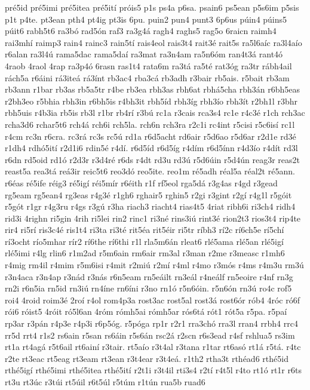 {pré5id
pré5imi
pré5itea
pré5ití
próis5
p1s
ps4a
p6sa.
psain6
ps5ean
p5s6im
p5sis
p1t
p4te.
pt3ean
pth4
pt4ig
pt3is
6pu.
puin2
pun4
punt3
6p6us
púin4
púins5
púit6
rabh5t6
ra3bó
rad5ón
raf3
ra3g4á
ragh4
raghs5
rag5o
6raicn
raimh4
rai3mhí
raimp3
rain4
rainc3
rain5tí
rais4eol
rais3t4
rait3é
rait5s
ra5l6aíc
ra3l4aío
r6alan
ra3l4ú
rama5dac
rama5daí
ra3mat
ra3n4am
ra5n6óm
ran4t3á
rant4ó
4raob
4raol
4rap
ra3p4ó
6rasn
ras1t4
rata6m
ra3tá
ra5té
rat3óg
ra3tr
rábh4ail
rách5a
r6áini
rá3iteá
rá3ínt
rb3ac4
rba3cá
rb3adh
r3bair
rb5ais.
r5bait
rb3am
rb3ann
r1bar
rb3as
rb5a5tr
r4be
rb3ea
rbh3as
rbh6at
rbhá5cha
rbh3án
r6bh5eas
r2bh3eo
r5bhia
rbh3in
r6bh5is
r4bh3it
rbh5íd
rbh3íg
rbh3ío
rbh3ít
r2bh1l
r3bhr
rbh5uis
r4b3ia
rb5is
rb3l
r1br
rb4rí
r3bú
rc1a
r3cais
rca3s4
rc1e
r4c3é
r1ch
rch3ac
rcha3d6
rchar5t6
rch4á
rch6i
rch5la.
rch6n
rch3ra
r2c1i
rc4int
r5cisi
r5c6isí
rc1l
r4cm
rc3n
r6cra.
rc3rá
rc3s
rc5ú
rd1a
r6d5acht
rd6air
r5d6ao
r5d6ar
r2d1e
rd3é
r1dh4
rdhó5ití
r2d1i6
rdin5é
r4dí.
r6d5íd
r6d5íg
r4dím
r6d5ínn
r4d3ío
r4dít
rd3l
r6dn
rd5oid
rd1ó
r2d3r
r3d4ré
r6ds
r4dt
rd3u
rd3ú
r5d6úin
r5d4ún
reag3r
reas2t
reast5a
rea3tá
reá3ir
reic5t6
reo3dó
reo5ite.
reo1m
ré5adh
réal5a
réal2t
ré5ann.
r6éas
ré5ife
réig3
ré5igí
réi5mír
r6éith
r1f
rf5eol
rga5dá
r3g4as
r4gd
r3gead
rg5eam
rg5ean4
rg3eas
r4g3é
r1gh6
rghair5
rghin5
r2gi
r3gint
r2gí
r4g1l
r5góit
r5gót
r1gr
r4g3ru
r4gs
r3gú
r3ha
riach3
riacht4
rias4t5
4riat
ribh6i
ri3ch4
ridh4
rid3i
4righn
ri5gin
4rih
ri5lei
rin2
rinc1
ri3né
rins3iú
rint3é
rion2t3
rios3t4
rip4te
rir4
ri5rí
ris3c4é
ris1t4
ri3ta
ri3té
rit5éa
rit5éir
ri5tr
ríbh3
rí2c
rí6ch5e
rí5chí
rí3ocht
río5mhar
rír2
rí6the
rí6thi
r1l
rla5m6án
rleat6
rlé5ama
rlé5an
rlé5igí
rlé5imi
r4lg
rlin6
r1m2ad
r5m6ain
rm6air
rm3al
r3man
r2me
r3measc
r1mh6
r4mig
rm4il
r4mim
r5m6isi
r4mit
r2miú
r2mí
r4ml
r4mo
r3mós
r4ms
r4m3u
rm3ú
r3n4aca
r3n4ap
r3nád
r3nás
r6n5eam
rn5eáilt
rn3eál
r4neálf
rn5eoire
r4nf
rn3g
rn2i
r6n5ia
rn5id
rn3iú
rn4íne
rn6íni
r3no
rn1ó
r5n6óin.
r5n6ón
rn3ú
ro4c
rof5
roi4
4roid
roim3é
2roí
r4ol
rom4p3a
rost3ac
rost5al
rost3á
rost6ór
rób4
4róc
ró6f
rói6
róist5
4róit
ró5l6an
4róm
rómh5ai
rómh5ar
rós6tá
rót1
rót5a
r5pa.
r5paí
rp3ar
r3pán
r4p3e
r4p3i
r6p5óg.
r5póga
rp1r
r2r1
rra3chó
rra3l
rran4
rrbh4
rrc4
rr5d
rrt4
r1s2
rs6ain
r5san
rs6áin
r5s6án
rsc2á
r2scn
r6s3ead
r4sf
rshlua5
rs3im
rt1a
rt4agá
r5t6ail
rt6ainí
r3tair.
rt5aío
r3t4al
r3tana
r1tar
rt6asó
rt1á
r5tá.
r4tc
r2te
rt3eac
rt5eag
rt3eam
rt3ean
r3t4ear
r3t4eá.
r1th2
rtha3t
rthéad6
rthé5id
rthé5igí
rthé5imi
rthé5itea
rthé5ití
r2t1i
r3t4il
rti3s4
r2tí
r4t5l
r4to
rt1ó
rt1r
r6ts
rt3u
rt3úc
r3túi
rt5úil
r6t5úl
r5túm
r1tún
rua5b
ruad6
}
